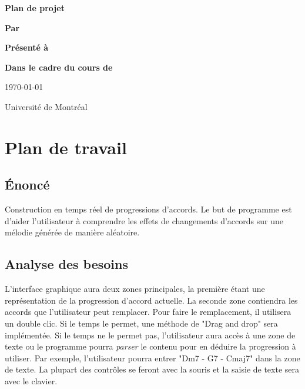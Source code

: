 \documentclass[letterpaper,12pt]{scrartcl}
\begin{document}
	\begin{center}
		\vspace{2cm}

		{\Huge\bf\sf Plan de projet}
		\vspace{4cm}

		{\bf\sf Par}

		\vspace{0.5cm}{\large\bf\sf François Poitras}

		\vspace{2cm}

		{\bf\sf Présenté à}

		\vspace{0.5cm}{\large\bf\sf Olivier Bélanger}

		\vspace{2cm}

		{\bf\sf Dans le cadre du cours de}

		\vspace{0.5cm}{\large\bf\sf Création Musicale en Language Python 2 (MUS2323)}

		\vspace{\fill}
		
		\today

		\vspace{0.5cm}
		Université de Montréal
	\end{center}

	\newpage
	
	\section{Plan de travail}
	\subsection{Énoncé}
	Construction en temps réel de progressions d'accords. Le but de programme est d'aider l'utilisateur à comprendre les effets de changements d'accords sur une mélodie générée de manière aléatoire.
	
	\subsection{Analyse des besoins}
	
	L'interface graphique aura deux zones principales, la première étant une représentation de la progression d'accord actuelle. La seconde zone contiendra les accords que l'utilisateur peut remplacer. Pour faire le remplacement, il utilisera un double clic. Si le temps le permet, une méthode de "Drag and drop" sera implémentée. Si le temps ne le permet pas, l'utilisateur aura accès à une zone de texte ou le programme pourra \textit{parser} le contenu pour en déduire la progression à utiliser. Par exemple, l'utilisateur pourra entrer "Dm7 - G7 - Cmaj7" dans la zone de texte. La plupart des contrôles se feront avec la souris et la saisie de texte sera avec le clavier.
	
\end{document}
